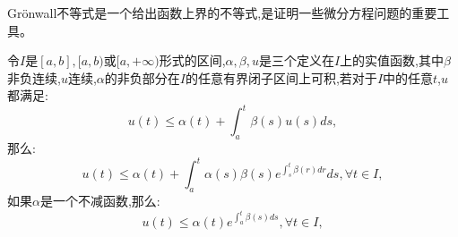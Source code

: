 Grönwall不等式是一个给出函数上界的不等式,是证明一些微分方程问题的重要工具。
\begin{thm}
    令$I$是$[a,b],[a,b)$或$[a,+\infty)$形式的区间,$\alpha,\beta,u$是三个定义在$I$上的实值函数,其中$\beta$非负连续,$u$连续,$\alpha$的非负部分在$I$的任意有界闭子区间上可积,若对于$I$中的任意$t$,$u$都满足:
    \begin{equation}\label{eq:gronwall}
        u(t) \leq \alpha(t) + \int_{a}^{t} \beta(s)u(s) ds,
    \end{equation}
    那么:
    \begin{equation}
        u(t) \leq \alpha(t) + \int_{a}^{t} \alpha(s)\beta(s) e^{\int_{s}^{t} \beta(r) dr} ds,\forall t \in I,
    \end{equation}
    如果$\alpha$是一个不减函数,那么:
    \begin{equation}\label{eq:gronwall2}
        u(t) \leq \alpha(t) e^{\int_{a}^{t} \beta(s) ds},\forall t \in I,
    \end{equation}
\end{thm}
